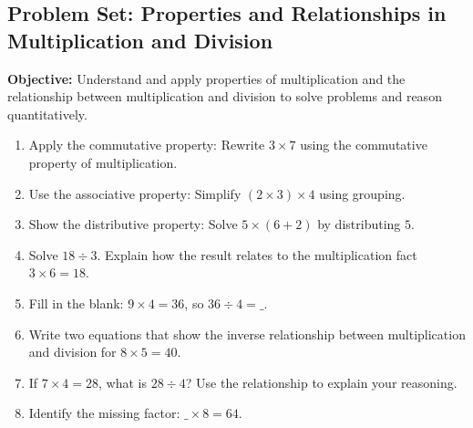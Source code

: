 \documentclass[12pt]{article}
\title{}
\date{}
\begin{document}
\subsection*{Problem Set: Properties and Relationships in Multiplication and Division}
\onehalfspacing

\begin{tcolorbox}[colframe=black!40, colback=gray!5, 
coltitle=black, colbacktitle=black!20, fonttitle=\bfseries\Large, 
title=Learning Objective, halign title=center, left=5pt, right=5pt, top=5pt, bottom=15pt]
\textbf{Objective:} Understand and apply properties of multiplication and the relationship between multiplication and division to solve problems and reason quantitatively.
\end{tcolorbox}

\begin{tcolorbox}[colframe=black!60, colback=white, 
coltitle=black, colbacktitle=black!15, fonttitle=\bfseries\Large, 
title=Exercises, halign title=center, left=10pt, right=10pt, top=10pt, bottom=20pt]
\begin{enumerate}[itemsep=3em]
    \item Apply the commutative property: Rewrite \(3 \times 7\) using the commutative property of multiplication.
    \item Use the associative property: Simplify \( (2 \times 3) \times 4 \) using grouping.
    \item Show the distributive property: Solve \(5 \times (6 + 2)\) by distributing \(5\).
    \item Solve \(18 \div 3\). Explain how the result relates to the multiplication fact \(3 \times 6 = 18\).
    \item Fill in the blank: \(9 \times 4 = 36\), so \(36 \div 4 = \_ \).
    \item Write two equations that show the inverse relationship between multiplication and division for \(8 \times 5 = 40\).
    \item If \(7 \times 4 = 28\), what is \(28 \div 4\)? Use the relationship to explain your reasoning.
    \item Identify the missing factor: \(\_ \times 8 = 64\).
\end{enumerate}
\end{tcolorbox}

\vspace{1em}
\end{document}
